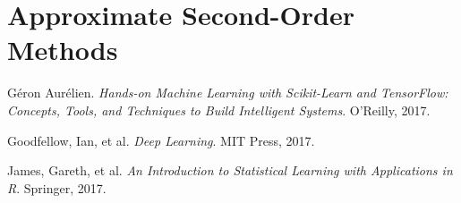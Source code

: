 \documentclass[12pt,letterpaper]{article}
\begin{document}
\section{Approximate Second-Order Methods}










\begin{thebibliography}{9}


Géron Aurélien. \textit{Hands-on Machine Learning with Scikit-Learn and TensorFlow: Concepts, Tools, and Techniques to Build Intelligent Systems}. O'Reilly, 2017.

Goodfellow, Ian, et al. \textit{Deep Learning}. MIT Press, 2017.

James, Gareth, et al. \textit{An Introduction to Statistical Learning with Applications in R}. Springer, 2017.


\end{thebibliography}


\end{document}
